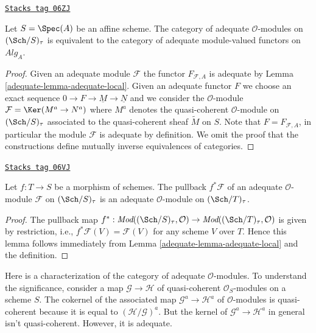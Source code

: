 \begin{lemma}
\label{adequate-lemma-adequate-affine}
\href{https://stacks.math.columbia.edu/tag/06ZJ}{\texttt{Stacks tag 06ZJ}}

Let $S = \Spec(A)$ be an affine scheme. The category of adequate
$\mathcal{O}$-modules on $(\Sch/S)_\tau$ is equivalent to the
category of adequate module-valued functors on $\textit{Alg}_A$.
\end{lemma}

\begin{proof}

Given an adequate module $\mathcal{F}$ the functor $F_{\mathcal{F}, A}$
is adequate by Lemma \ref{adequate-lemma-adequate-local}.
Given an adequate functor $F$ we choose an exact sequence
$0 \to F \to \underline{M} \to \underline{N}$ and we consider
the $\mathcal{O}$-module $\mathcal{F} = \Ker(M^a \to N^a)$ where
$M^a$ denotes the quasi-coherent $\mathcal{O}$-module on
$(\Sch/S)_\tau$ associated to the quasi-coherent sheaf
$\widetilde{M}$ on $S$. Note that $F = F_{\mathcal{F}, A}$, in particular
the module $\mathcal{F}$ is adequate by definition.
We omit the proof that the constructions define mutually inverse
equivalences of categories.
\end{proof}

\begin{lemma}
\label{adequate-lemma-pullback-adequate}
\href{https://stacks.math.columbia.edu/tag/06VJ}{\texttt{Stacks tag 06VJ}}

Let $f : T \to S$ be a morphism of schemes.
The pullback $f^*\mathcal{F}$ of an adequate $\mathcal{O}$-module
$\mathcal{F}$ on $(\Sch/S)_\tau$ is an adequate
$\mathcal{O}$-module on $(\Sch/T)_\tau$.
\end{lemma}

\begin{proof}

The pullback map
$f^* : \textit{Mod}((\Sch/S)_\tau, \mathcal{O}) \to
\textit{Mod}((\Sch/T)_\tau, \mathcal{O})$
is given by restriction, i.e., $f^*\mathcal{F}(V) = \mathcal{F}(V)$
for any scheme $V$ over $T$. Hence this lemma follows immediately from
Lemma \ref{adequate-lemma-adequate-local}
and the definition.
\end{proof}

Here is a characterization of the category of adequate $\mathcal{O}$-modules.
To understand the significance, consider a map $\mathcal{G} \to \mathcal{H}$
of quasi-coherent $\mathcal{O}_S$-modules on a scheme $S$.
The cokernel of the associated map $\mathcal{G}^a \to \mathcal{H}^a$
of $\mathcal{O}$-modules is quasi-coherent because it is equal to
$(\mathcal{H}/\mathcal{G})^a$. But the kernel of
$\mathcal{G}^a \to \mathcal{H}^a$ in general isn't
quasi-coherent. However, it is adequate.

